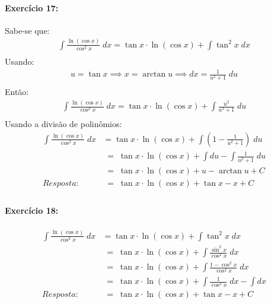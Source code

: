 \documentclass[12pt]{article}
\begin{document}
\paragraph{Exercício 17:}
Sabe-se que:
\begin{align*}
\int \frac{\ln \left ( \cos x \right )}{\cos ^{2}x}\;dx = \tan x\cdot \ln\left ( \cos x \right ) + \int \tan^{2}x \;dx\\
\end{align*}
Usando:
\begin{align*}
 u = \tan x \implies x = \arctan u \implies dx = \frac{1}{u^{2}+1}\;du\\
\end{align*}
Então:
\begin{align*}
\int \frac{\ln\left ( \cos x \right )}{\cos^{2}x}\;dx = \tan x \cdot\ln\left ( \cos x \right ) + \int\frac{u^{2}}{u^{2}+1}\;du\\
\end{align*}
Usando a divisão de polinômios:
\begin{align*}
\int \frac{\ln\left ( \cos x \right )}{\cos^{2}x}\;dx &= \tan x \cdot\ln\left ( \cos x \right ) +  \int\left (1-\frac{1}{u^{2}+1}  \right )\;du\\
&\;=\;\tan x \cdot\ln\left ( \cos x \right ) +  \int du - \int \frac{1}{u^{2}+1}\;du\\
&\;=\;\tan x \cdot\ln\left ( \cos x \right ) +  u - \arctan u + C\\
Resposta: &\;=\;\tan x \cdot\ln\left ( \cos x \right ) +  \tan x - x + C\\
\end{align*}


\paragraph{Exercício 18:}
\begin{align*}
\int \frac{\ln\left ( \cos x \right )}{\cos^{2}x}\;dx &= \tan x \cdot\ln\left ( \cos x \right )+\int\tan ^{2}x\;dx\\
&\;=\;\tan x \cdot\ln\left ( \cos x \right)+\int\frac{\sin^{2}x}{\cos^{2}x}\;dx\\
&\;=\;\tan x \cdot\ln\left ( \cos x \right )+\int\frac{1-\cos^{2}x}{\cos^{2}x}\;dx\\
&\;=\;\tan x \cdot\ln\left ( \cos x \right )+\int\frac{1}{\cos^{2}x}\;dx-\int dx\\
Resposta: &\;=\;\tan x \cdot\ln\left ( \cos x \right )+\tan x - x + C\\\\\\\\\\\\\\
\end{align*}
\end{document}
